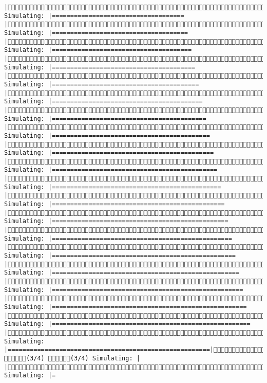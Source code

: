 \documentclass[]{article}
\begin{document}
\begin{verbatim}
|(2/4) Simulating: |====================================                   |(2/4) Simulating: |=====================================                  |(2/4) Simulating: |======================================                 |(2/4) Simulating: |=======================================                |(2/4) Simulating: |========================================               |(2/4) Simulating: |=========================================              |(2/4) Simulating: |==========================================             |(2/4) Simulating: |===========================================            |(2/4) Simulating: |============================================           |(2/4) Simulating: |=============================================          |(2/4) Simulating: |==============================================         |(2/4) Simulating: |===============================================        |(2/4) Simulating: |================================================       |(2/4) Simulating: |=================================================      |(2/4) Simulating: |==================================================     |(2/4) Simulating: |===================================================    |(2/4) Simulating: |====================================================   |(2/4) Simulating: |=====================================================  |(2/4) Simulating: |====================================================== |(2/4) Simulating: |=======================================================|(2/4) (3/4) (3/4) Simulating: |                                                       |(3/4) Simulating: |=                                                 
\end{verbatim}
\end{document}
